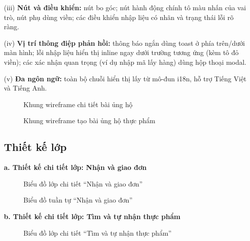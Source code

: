 \documentclass[../main.tex]{subfiles}%
\begin{document}
(iii) \textbf{Nút và điều khiển:} nút bo góc; nút hành động chính tô màu nhấn của vai trò, nút phụ dùng viền; các điều khiển nhập liệu có nhãn và trạng thái lỗi rõ ràng.
  
(iv) \textbf{Vị trí thông điệp phản hồi:} thông báo ngắn dùng toast ở phía trên/dưới màn hình; lỗi nhập liệu hiển thị inline ngay dưới trường tương ứng (kèm tô đỏ viền); các xác nhận quan trọng (ví dụ nhập mã lấy hàng) dùng hộp thoại modal.

(v) \textbf{Đa ngôn ngữ:} toàn bộ chuỗi hiển thị lấy từ mô-đun i18n, hỗ trợ Tiếng Việt và Tiếng Anh.

\begin{figure}[H]
    \centering
    \caption{Khung wireframe chi tiết bài ủng hộ}
    \label{fig:WF_ChiTietBaiUngHo}
\end{figure}

\begin{figure}[H]
    \centering
    \caption{Khung wireframe tạo bài ủng hộ thực phẩm}
    \label{fig:WF_TaoBaiUngHo}
\end{figure}

\subsection{Thiết kế lớp}
\label{subsection:4.2.2}

\textbf{a. Thiết kế chi tiết lớp: Nhận và giao đơn}

\begin{figure}[H]
    \centering
    \caption{Biểu đồ lớp chi tiết ``Nhận và giao đơn''}
    \label{fig:cls_nhan}
\end{figure}

\begin{figure}[H]
    \centering
    \caption{Biểu đồ tuần tự ``Nhận và giao đơn''}
    \label{fig:seq_nhan}
\end{figure}

\textbf{b. Thiết kế chi tiết lớp: Tìm và tự nhận thực phẩm}

\begin{figure}[H]
    \centering
    \caption{Biểu đồ lớp chi tiết ``Tìm và tự nhận thực phẩm''}
    \label{fig:cls_giao}
\end{figure}
\end{document}
